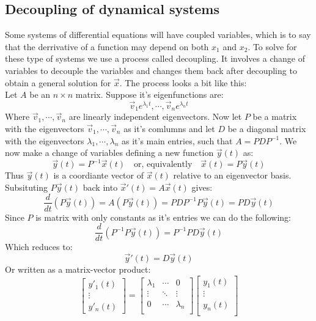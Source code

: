 \documentclass[11pt, a4paper]{article}
\begin{document}
\subsection{Decoupling of dynamical systems}
Some systems of differential equations will have coupled variables, which is to say that the derrivative of a function may depend on both $x_1$ and $x_2$. To solve for these type of systems we use a process called decoupling. It involves a change of variables to decouple the variables and changes them back after decoupling to obtain a general solution for $\vec{x}$. The process looks a bit like this:\\
Let $A$ be an $n \times n$ matrix. Suppose it's eigenfunctions are:
\begin{equation*}
  \vec{v}_1 e^{\lambda_1 t}, \cdots, \vec{v}_n e^{\lambda_n t}
\end{equation*}
Where $\vec{v}_1,\cdots, \vec{v}_n$ are linearly independent eigenvectors. Now let $P$ be a matrix with the eigenvectors $\vec{v}_1, \cdots, \vec{v}_n$ as it's comlumns and let $D$ be a diagonal matrix with the eigenvectors $\lambda_1, \cdots, \lambda_n$ as it's main entries, such that $A = PDP^{-1}$. We now make a change of variables defining a new function $\vec{y}(t)$ as:
\begin{equation*}
  \vec{y}(t) = P^{-1}\vec{x}(t) \quad \text{or, equivalently} \quad \vec{x}(t) = P \vec{y}(t)
\end{equation*}
Thus $\vec{y}(t)$ is a coordiante vector of $\vec{x}(t)$ relative to an eigenvector basis. Subsituting $P\vec{y}(t)$ back into $\vec{x}'(t) = A\vec{x}(t)$ gives:
\begin{equation*}
  \frac{d}{dt}(P\vec{y}(t)) = A(P\vec{y}(t)) = PDP^{-1}P\vec{y}(t) = PD\vec{y}(t)
\end{equation*}
Since $P$ is matrix with only constants as it's entries we can do the following:
\begin{equation*}
  \frac{d}{dt}(P^{-1}P\vec{y}(t)) = P^{-1}PD\vec{y}(t)
\end{equation*}
Which reduces to:
\begin{equation*}
  \vec{y}'(t) = D\vec{y}(t)
\end{equation*}
Or written as a matrix-vector product:
\begin{equation*}
  \begin{bmatrix}
    y'_1(t)\\
    \vdots\\
    y'_n(t)
  \end{bmatrix}
  =
  \begin{bmatrix}
    \lambda_1 & \cdots & 0\\
    \vdots & \ddots & \vdots\\
    0 & \cdots & \lambda_n\\
  \end{bmatrix}
  \begin{bmatrix}
    y_1(t)\\
    \vdots\\
    y_n(t)\\
  \end{bmatrix}
\end{equation*}
\end{document}
